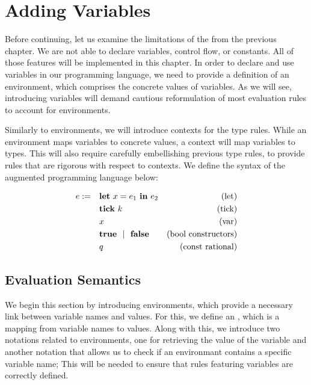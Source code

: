 \chapter{Adding Variables}

Before continuing, let us examine the limitations of the  from the previous chapter. We are not able to declare variables, control flow, or constants. All of those features will be implemented in this chapter. In order to declare and use variables in our programming language, we need to provide a definition of an environment, which comprises the concrete values of variables. As we will see, introducing variables will demand cautious reformulation of most evaluation rules to account for environments.

Similarly to environments, we will introduce contexts for the type rules. While an environment maps variables to concrete values, a context will map variables to types. This will also require carefully embellishing previous type rules, to provide rules that are rigorous with respect to contexts. We define the syntax of the augmented programming language below:


\begin{definition}
   \label{def:prog-lang-5}

\begin{align*}
   e := ~~~ & \mathbf{let}~x = e_1~\mathbf{in}~e_2		& \text{(let)}\\
            & \mathbf{tick}~k				& \text{(tick)}\\
	    & x					& \text{(var)}\\
	    & \mathbf{true} ~~| ~~\mathbf{false}		& \text{(bool constructors)}\\
	    & q					& \text{(const rational)}\\
\end{align*}

\end{definition}


\section{Evaluation Semantics}

We begin this section by introducing environments, which provide a necessary link between variable names and values. For this, we define an , which is a mapping from variable names to values. Along with this, we introduce two notations related to environments, one for retrieving the value of the variable and another notation that allows us to check if an environmant contains a specific variable name; This will be needed to ensure that rules featuring variables are correctly defined.

